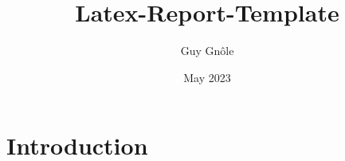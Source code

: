 \documentclass{scrreprt}
\title{Latex-Report-Template}
\author{Guy Gnôle}
\date{May 2023}
\begin{document}
\maketitle

\section{Introduction}
\end{document}
